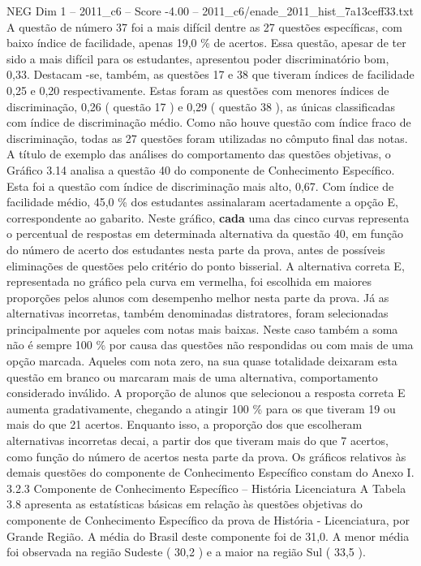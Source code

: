 \begin{textsample}{NEG Dim 1 – 2011\_c6 – Score -4.00 – 2011\_c6/enade\_2011\_hist\_7a13ceff33.txt}
A questão de número 37 foi a mais difícil dentre as 27 questões específicas, com baixo índice de facilidade, apenas 19,0 \% de acertos.
Essa questão, apesar de ter sido a mais difícil para os estudantes, apresentou poder discriminatório bom, 0,33.
Destacam -se, também, as questões 17 e 38 que tiveram índices de facilidade 0,25 e 0,20 respectivamente.
Estas foram as questões com menores índices de discriminação, 0,26 ( questão 17 ) e 0,29 ( questão 38 ), as únicas classificadas com índice de discriminação médio.
Como não houve questão com índice fraco de discriminação, todas as 27 questões foram utilizadas no cômputo final das notas.
A título de exemplo das análises do comportamento das questões objetivas, o Gráfico 3.14 analisa a questão 40 do componente de Conhecimento Específico.
Esta foi a questão com índice de discriminação mais alto, 0,67.
Com índice de facilidade médio, 45,0 \% dos estudantes assinalaram acertadamente a opção E, correspondente ao gabarito.
Neste gráfico, \textbf{cada} uma das cinco curvas representa o percentual de respostas em determinada alternativa da questão 40, em função do número de acerto dos estudantes nesta parte da prova, antes de possíveis eliminações de questões pelo critério do ponto bisserial.
A alternativa correta E, representada no gráfico pela curva em vermelha, foi escolhida em maiores proporções pelos alunos com desempenho melhor nesta parte da prova.
Já as alternativas incorretas, também denominadas distratores, foram selecionadas principalmente por aqueles com notas mais baixas.
Neste caso também a soma não é sempre 100 \% por causa das questões não respondidas ou com mais de uma opção marcada.
Aqueles com nota zero, na sua quase totalidade deixaram esta questão em branco ou marcaram mais de uma alternativa, comportamento considerado inválido.
A proporção de alunos que selecionou a resposta correta E aumenta gradativamente, chegando a atingir 100 \% para os que tiveram 19 ou mais do que 21 acertos.
Enquanto isso, a proporção dos que escolheram alternativas incorretas decai, a partir dos que tiveram mais do que 7 acertos, como função do número de acertos nesta parte da prova.
Os gráficos relativos às demais questões do componente de Conhecimento Específico constam do Anexo I. 3.2.3 Componente de Conhecimento Específico – História Licenciatura A Tabela 3.8 apresenta as estatísticas básicas em relação às questões objetivas do componente de Conhecimento Específico da prova de História - Licenciatura, por Grande Região.
A média do Brasil deste componente foi de 31,0.
A menor média foi observada na região Sudeste ( 30,2 ) e a maior na região Sul ( 33,5 ).

\end{textsample}
